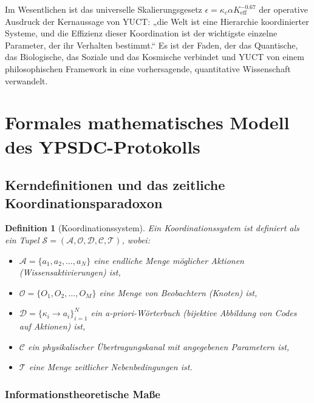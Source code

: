 \documentclass[11pt,a4paper]{article}
\newtheorem{definition}{Definition}
\begin{document}
	Im Wesentlichen ist das universelle Skalierungsgesetz \(\epsilon = \kappa_c \alpha K_{\mathrm{eff}}^{-0.67}\) der operative Ausdruck der Kernaussage von YUCT: „die Welt ist eine Hierarchie koordinierter Systeme, und die Effizienz dieser Koordination ist der wichtigste einzelne Parameter, der ihr Verhalten bestimmt.“ Es ist der Faden, der das Quantische, das Biologische, das Soziale und das Kosmische verbindet und YUCT von einem philosophischen Framework in eine vorhersagende, quantitative Wissenschaft verwandelt.
	
	
	\section{Formales mathematisches Modell des YPSDC-Protokolls}
	\label{sec:formal-model}
	
	\subsection{Kerndefinitionen und das zeitliche Koordinationsparadoxon}
	
	\begin{definition}[Koordinationssystem]
		Ein Koordinationssystem ist definiert als ein Tupel $\mathcal{S} = (\mathcal{A}, \mathcal{O}, \mathcal{D}, \mathcal{C}, \mathcal{T})$, wobei:
		\begin{itemize}
			\item $\mathcal{A} = \{a_1, a_2, \dots, a_N\}$ eine endliche Menge möglicher Aktionen (Wissensaktivierungen) ist,
			\item $\mathcal{O} = \{O_1, O_2, \dots, O_M\}$ eine Menge von Beobachtern (Knoten) ist,
			\item $\mathcal{D} = \{\kappa_i \to a_i\}_{i=1}^N$ ein a-priori-Wörterbuch (bijektive Abbildung von Codes auf Aktionen) ist,
			\item $\mathcal{C}$ ein physikalischer Übertragungskanal mit angegebenen Parametern ist,
			\item $\mathcal{T}$ eine Menge zeitlicher Nebenbedingungen ist.
		\end{itemize}
	\end{definition}
	
	\subsubsection{Informationstheoretische Maße}
	
\end{document}
